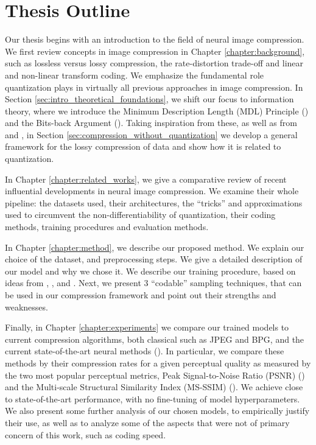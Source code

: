 \section{Thesis Outline}
\par 
Our thesis begins with an introduction to the field of neural image compression.
We first review concepts in image compression in Chapter
\ref{chapter:background}, such as lossless versus lossy
compression, the rate-distortion trade-off and linear and non-linear transform
coding. We emphasize the fundamental role quantization plays in virtually all
previous approaches in image compression. In Section
\ref{sec:intro_theoretical_foundations}, we shift our focus to information
theory, where we introduce the Minimum Description Length (MDL) Principle
(\cite{rissanen1981universal}) and the Bits-back Argument
(\cite{hinton1993keeping}). Taking inspiration from these, as well as from
\cite{harsha2007communication} and \cite{havasi2018minimal}, in Section
\ref{sec:compression_without_quantization}
we develop a general framework for the lossy compression of data and show how
it is related to quantization.

\par
In Chapter \ref{chapter:related_works}, we give a comparative review of recent
influential developments in neural image compression. We examine their whole
pipeline: the datasets used, their architectures, the ``tricks'' and
approximations used to circumvent the non-differentiability of quantization,
their coding methods, training procedures and evaluation methods.

\par
In Chapter \ref{chapter:method}, we describe our proposed method. We explain our
choice of the dataset, and preprocessing steps. We give a detailed description of
our model and why we chose it. We describe our
training procedure, based on ideas from \cite{sonderby2016train},
\cite{higgins2017beta}, \cite{balle2018variational} and \cite{dai2019diagnosing}.
Next, we present 3 ``codable'' sampling techniques, that can be used in our
compression framework and point out their strengths and weaknesses.

\par
Finally, in Chapter \ref{chapter:experiments} we compare our trained models to
current compression algorithms, both classical such as JPEG and BPG, and
the current state-of-the-art neural methods (\cite{balle2018variational}). In
particular, we compare these methods by their compression rates for a given
perceptual quality as measured by the two most popular perceptual metrics, Peak
Signal-to-Noise Ratio (PSNR) (\cite{psnr}) and the Multi-scale Structural
Similarity Index (MS-SSIM) (\cite{msssim}). We achieve close to
state-of-the-art performance, with no fine-tuning of model hyperparameters.
We also present some further analysis of our chosen models, to empirically
justify their use, as well as to analyze some of the aspects that were not of
primary concern of this work, such as coding speed.
\paragraph{}

